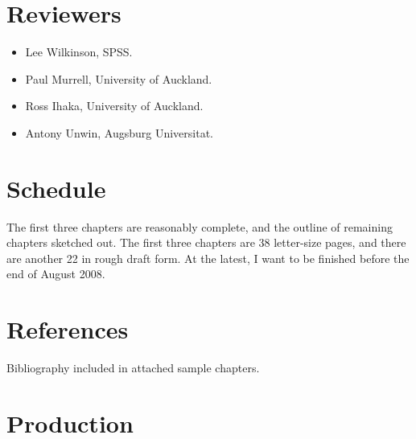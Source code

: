 \documentclass[oneside,letterpaper]{scrartcl}
\begin{document}
\section{Reviewers}\label{sec:reviewers}


\begin{itemize}

	\item Lee Wilkinson, SPSS.

	\item Paul Murrell, University of Auckland.

	\item Ross Ihaka, University of Auckland.

	\item Antony Unwin, Augsburg Universitat.

\end{itemize}

\section{Schedule}\label{sec:schedule}


The first three chapters are reasonably complete, and the outline of remaining chapters sketched out.  The first three chapters are 38 letter-size pages, and there are another 22 in rough draft form.  At the latest, I want to be finished before the end of August 2008.

\section{References}\label{sec:references} 


Bibliography included in attached sample chapters.

\section{Production}\label{sec:production}
\end{document}

